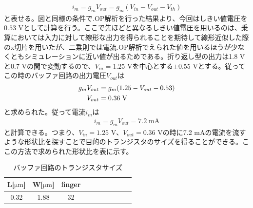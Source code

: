 \documentclass[twocolumn]{jsarticle}
\begin{document}
        \begin{align}
            i_{m}=g_{m}V_{out}=g_{m}(V_{in}-V_{out}-V_{th})
        \end{align}
        と表せる。図と同様の条件で.OP解析を行った結果より、今回はしきい値電圧を$0.53$ Vとして計算を行う。ここで先ほどと異なるしきい値電圧を用いるのは、乗算においては入力に対して線形な出力を得られることを期待して線形近似した際のx切片を用いたが、二乗則では電流.OP解析でえられた値を用いるほうが少なくともシミュレーションに近い値が出るためである。折り返し型の出力は1.8 Vと0.7 Vの間で変動するので、$V_{in}=1.25$ Vを中心とする$\pm 0.55$ Vとする。従ってこの時のバッファ回路の出力電圧$V_{out}$は
        \begin{align}
            g_{m}V_{out} &=g_{m}(1.25-V_{out}-0.53)     \notag\\
            V_{out}&=0.36\;\mathrm{V}   \notag
        \end{align}
        と求められた。従って電流$i_{m}$は
        \begin{align*}
            i_{m}=g_{m}V_{out}=7.2\;\mathrm{mA}
        \end{align*}
        と計算できる。つまり、$V_{in}=1.25$ V、$V_{out}=0.36$ Vの時に7.2 mAの電流を流すような形状比を探すことで目的のトランジスタのサイズを得ることができる。ここの方法で求められた形状比を表に示す。
        \begin{table}[H]
        \caption{バッファ回路のトランジスタサイズ}
        \label{table:buf_size}
        \centering
        \begin{tabular}{cccccccccc}
            L[$\mathrm{\mu m}$] & W[$\mathrm{\mu m}$] & finger\\
            \hline \hline
            0.32 & 1.88 & 32 \\  
        \end{tabular}
        \end{table}
\end{document}
